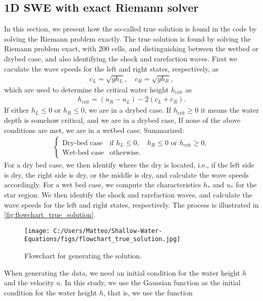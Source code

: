 \subsection*{1D SWE with exact Riemann solver}
In this section, we present how the so-called true solution is found in the code by solving the Riemann problem exactly.
The true solution is found by solving the Riemann problem exact, with 200 cells, and distinguishing between the wetbed or drybed case, and also identifying the shock and rarefaction waves.
First we caculate the wave speeds for the left and right states, respectively, as
\begin{align*}
    c_L = \sqrt{g h_L}, \quad c_R = \sqrt{g h_R},
\end{align*}
which are used to determine the critical water height $h_{\text{crit}}$ as
\begin{align*}
    h_{\text{crit}} = (u_R - u_L) - 2(c_L + c_R).
\end{align*}
If either $h_L \leq 0$ or $h_R \leq 0$, we are in a drybed case.
If $h_{\text{crit}} \geq 0$ it means the water depth is somehow critical, and we are in a drybed case,
If none of the above conditions are met, we are in a wetbed case.
Summarized:
\begin{align*}
    \begin{cases}
        \text{Dry-bed case} & \text{if }  h_L \leq 0, \quad  h_R \leq 0 \text{ or } h_{\text{crit}} \geq 0, \\
        \text{Wet-bed case} & \text{otherwise}.
    \end{cases}
\end{align*}
For a dry bed case, we then identify where the dry is located, i.e., if the left side is dry, the right side is dry, or the middle is dry, and calculate the wave speeds accordingly.
For a wet bed case, we compute the characteristics $h_*$ and $u_*$ for the star region.
We then identify the shock and rarefaction waves, and calculate the wave speeds for the left and right states, respectively.
The process is illustrated in \autoref{fig:flowchart_true_solution}.
\begin{figure}[H]
    \centering
    \texttt{[image: C:/Users/Matteo/Shallow-Water-Equations/figs/flowchart\_true\_solution.jpg]}
    \caption{Flowchart for generating the solution.}\label{fig:flowchart_true_solution}
\end{figure}
When generating the data, we need an initial condition for the water height $h$ and the velocity $u$.
In this study, we use the Gaussian function as the initial condition for the water height $h$, that is, we use the function
